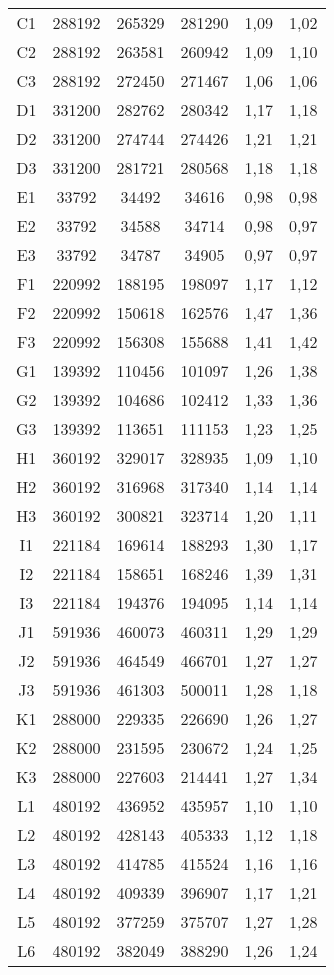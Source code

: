 \begin{center}
\begin{longtable}{cccccc}
    C1    & 288192 & 265329 & 281290 & 1,09  & 1,02 \\
    C2    & 288192 & 263581 & 260942 & 1,09  & 1,10 \\
    C3    & 288192 & 272450 & 271467 & 1,06  & 1,06 \\
    D1    & 331200 & 282762 & 280342 & 1,17  & 1,18 \\
    D2    & 331200 & 274744 & 274426 & 1,21  & 1,21 \\
    D3    & 331200 & 281721 & 280568 & 1,18  & 1,18 \\
    E1    & 33792 & 34492 & 34616 & 0,98  & 0,98 \\
    E2    & 33792 & 34588 & 34714 & 0,98  & 0,97 \\
    E3    & 33792 & 34787 & 34905 & 0,97  & 0,97 \\
    F1    & 220992 & 188195 & 198097 & 1,17  & 1,12 \\
    F2    & 220992 & 150618 & 162576 & 1,47  & 1,36 \\
    F3    & 220992 & 156308 & 155688 & 1,41  & 1,42 \\
    G1    & 139392 & 110456 & 101097 & 1,26  & 1,38 \\
    G2    & 139392 & 104686 & 102412 & 1,33  & 1,36 \\
    G3    & 139392 & 113651 & 111153 & 1,23  & 1,25 \\
    H1    & 360192 & 329017 & 328935 & 1,09  & 1,10 \\
    H2    & 360192 & 316968 & 317340 & 1,14  & 1,14 \\
    H3    & 360192 & 300821 & 323714 & 1,20  & 1,11 \\
    I1    & 221184 & 169614 & 188293 & 1,30  & 1,17 \\
    I2    & 221184 & 158651 & 168246 & 1,39  & 1,31 \\
    I3    & 221184 & 194376 & 194095 & 1,14  & 1,14 \\
    J1    & 591936 & 460073 & 460311 & 1,29  & 1,29 \\
    J2    & 591936 & 464549 & 466701 & 1,27  & 1,27 \\
    J3    & 591936 & 461303 & 500011 & 1,28  & 1,18 \\
    K1    & 288000 & 229335 & 226690 & 1,26  & 1,27 \\
    K2    & 288000 & 231595 & 230672 & 1,24  & 1,25 \\
    K3    & 288000 & 227603 & 214441 & 1,27  & 1,34 \\
    L1    & 480192 & 436952 & 435957 & 1,10  & 1,10 \\
    L2    & 480192 & 428143 & 405333 & 1,12  & 1,18 \\
    L3    & 480192 & 414785 & 415524 & 1,16  & 1,16 \\
    L4    & 480192 & 409339 & 396907 & 1,17  & 1,21 \\
    L5    & 480192 & 377259 & 375707 & 1,27  & 1,28 \\
    L6    & 480192 & 382049 & 388290 & 1,26  & 1,24 \\
\end{longtable}
\end{center}


